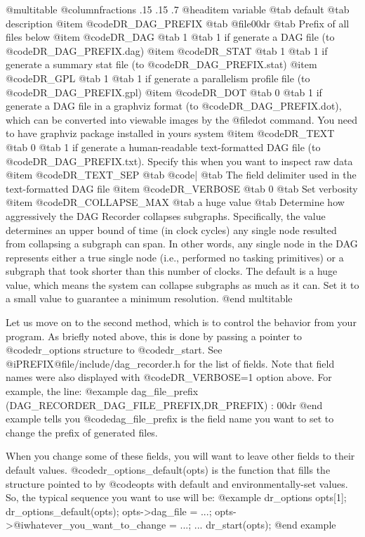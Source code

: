 @multitable @columnfractions .15 .15 .7
@headitem variable @tab default @tab description
@item @code{DR_DAG_PREFIX} @tab @file{00dr}  @tab Prefix of all files below
@item @code{DR_DAG}  @tab 1 @tab 1 if generate a DAG file (to @code{DR_DAG_PREFIX}.dag)
@item @code{DR_STAT} @tab 1 @tab 1 if generate a summary stat file (to @code{DR_DAG_PREFIX}.stat)
@item @code{DR_GPL}  @tab 1 @tab 1 if generate a parallelism profile file (to @code{DR_DAG_PREFIX}.gpl)
@item @code{DR_DOT}  @tab 0 @tab 1 if generate a DAG file in a graphviz format (to @code{DR_DAG_PREFIX}.dot), which can be converted into viewable images by the @file{dot} command.  You need to have graphviz package installed in yours system 
@item @code{DR_TEXT} @tab 0 @tab 1 if generate a human-readable text-formatted DAG file (to @code{DR_DAG_PREFIX}.txt).  Specify this when you want to inspect raw data 
@item @code{DR_TEXT_SEP} @tab @code{|} @tab The field delimiter used in the text-formatted DAG file 
@item @code{DR_VERBOSE}  @tab 0  @tab Set verbosity 
@item @code{DR_COLLAPSE_MAX} @tab a huge value @tab Determine how aggressively the DAG Recorder collapses subgraphs.  Specifically, the value determines an upper bound of time (in clock cycles) any single node resulted from collapsing a subgraph can span.  In other words, any single node in the DAG represents either a true single node (i.e., performed no tasking primitives) or a subgraph that took shorter than this number of clocks.  The default is a huge value, which means the system can collapse subgraphs as much as it can.  Set it to a small value to guarantee a minimum resolution.
@end multitable

Let us move on to the second method, which is to control the behavior
from your program.  As briefly noted above, this is done by passing a
pointer to @code{dr_options} structure to @code{dr_start}.  See
@i{PREFIX}@file{/include/dag_recorder.h} for the list of fields.  Note
that field names were also displayed with @code{DR_VERBOSE=1} option
above.  For example, the line:
@example
dag_file_prefix (DAG_RECORDER_DAG_FILE_PREFIX,DR_PREFIX) : 00dr
@end example
tells you @code{dag_file_prefix} is the field name you want to set to change
the prefix of generated files.

When you change some of these fields, you will want to leave other
fields to their default values.  @code{dr_options_default(opts)}
is the function that fills the structure pointed to by @code{opts}
with default and environmentally-set values.  So, the typical sequence you want to use will be:
@example
dr_options opts[1];
dr_options_default(opts);
opts->dag_file = ...;
opts->@i{whatever_you_want_to_change} = ...;
   ...
dr_start(opts);
@end example

